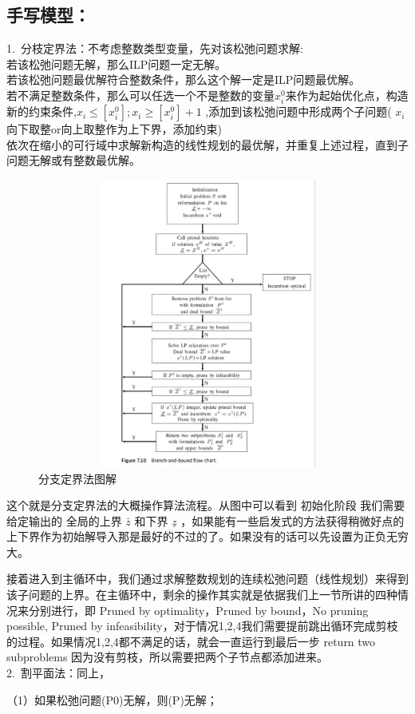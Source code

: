 \documentclass[a4paper,20pt]{article}
\begin{document}
\subsection{手写模型：}
1.~分枝定界法：不考虑整数类型变量，先对该松弛问题求解:
\\若该松弛问题无解，那么ILP问题一定无解。
\\若该松弛问题最优解符合整数条件，那么这个解一定是ILP问题最优解。
\\若不满足整数条件，那么可以任选一个不是整数的变量$x_i^0$来作为起始优化点，构造新的约束条件,$x_i \leq \left[x_i^0\right];x_i\geq \left[x_i^0\right]+1 $ ,添加到该松弛问题中形成两个子问题( $x_i$向下取整or向上取整作为上下界，添加约束)
\\依次在缩小的可行域中求解新构造的线性规划的最优解，并重复上述过程，直到子问题无解或有整数最优解。
\begin{figure}[H]
    \centering
    \includegraphics[width=340pt,height=270pt]{figure3.png}
    \caption{分支定界法图解}
\end{figure}
这个就是分支定界法的大概操作算法流程。从图中可以看到 初始化阶段 我们需要给定输出的 全局的上界 $\bar{z}$ 和下界 $\underline{z}$ ，如果能有一些启发式的方法获得稍微好点的上下界作为初始解导入那是最好的不过的了。如果没有的话可以先设置为正负无穷大。

接着进入到主循环中，我们通过求解整数规划的连续松弛问题（线性规划）来得到该子问题的上界。在主循环中，剩余的操作其实就是依据我们上一节所讲的四种情况来分别进行，即 Pruned by optimality，Pruned by bound，No pruning possible, Pruned by infeasibility，对于情况1,2,4我们需要提前跳出循环完成剪枝的过程。如果情况1,2,4都不满足的话，就会一直运行到最后一步 return two subproblems 因为没有剪枝，所以需要把两个子节点都添加进来。
\\2.~割平面法：同上，
\par \noindent（1）如果松弛问题(P0)无解，则(P)无解；
\end{document}
